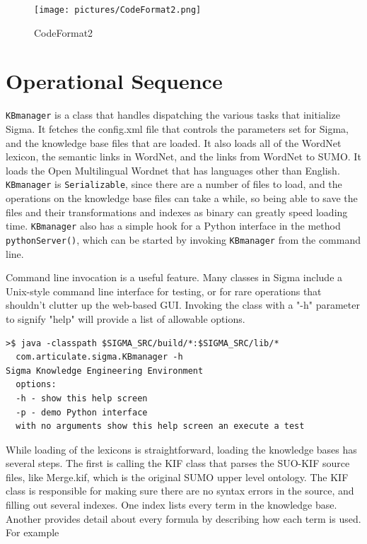 \documentclass{book}
\begin{document}
\begin{figure}
  \centering
  \texttt{[image: pictures/CodeFormat2.png]}
  \caption{CodeFormat2}
  \label{fig:CodeFormat2}
\end{figure}

\section{Operational Sequence}

\texttt{KBmanager} is a class that handles dispatching
the various tasks that initialize Sigma.  It fetches the config.xml file that
controls the parameters set for Sigma, and the knowledge base files that are
loaded. It also loads all of the WordNet lexicon, the semantic links in WordNet,
and the links from WordNet to SUMO.  It loads the Open Multilingual Wordnet that
has languages other than English.  \texttt{KBmanager} is \texttt{Serializable},
since there are a number of files to load, and the operations on the knowledge
base files can take a while, so being able to save the files and their
transformations and indexes as binary can greatly speed loading time.
\texttt{KBmanager} also has a simple hook for a Python interface in the method
\texttt{pythonServer()}, which can be started by invoking \texttt{KBmanager}
from the command line.

Command line invocation is a useful feature.  Many classes in Sigma include a 
Unix-style command line interface for testing, or for rare operations that
shouldn't clutter up the web-based GUI.  Invoking the class with a "-h" 
parameter to signify "help" will provide a list of allowable options.

\begin{lstlisting}[basicstyle=\ttfamily\small\bfseries]
>$ java -classpath $SIGMA_SRC/build/*:$SIGMA_SRC/lib/* 
  com.articulate.sigma.KBmanager -h
Sigma Knowledge Engineering Environment
  options:
  -h - show this help screen
  -p - demo Python interface
  with no arguments show this help screen an execute a test
\end{lstlisting}

While loading of the lexicons is straightforward, loading the knowledge bases
has several steps.  The first is calling the KIF class that parses the SUO-KIF
source files, like Merge.kif, which is the original SUMO upper level ontology.
The KIF class is responsible for making sure there are no syntax errors in the
source, and filling out several indexes.  One index lists every term in the
knowledge base.  Another provides detail about every formula by describing
how each term is used.  For example
\end{document}
